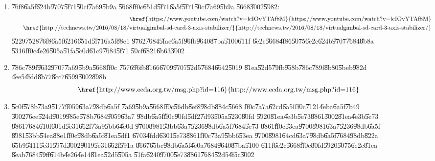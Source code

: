 \documentclass[12pt,a4paper]{article}
\begin{document}
\begin{enumerate}
\item \U{76f8}\U{6a5f}\U{624b}\U{9707}\U{5f71}\U{50cf}\U{7a69}\U{5b9a}%
\U{5668}\U{ff0c}\U{651d}\U{5f71}\U{6a5f}\U{5f71}\U{50cf}\U{7a69}\U{5b9a}%
\U{5668}\U{3002}\U{5982}:%
\begin{eqnarray*}
&&\text{\href{https://www.youtube.com/watch?v=lcIOvYTAf8M}{%
https://www.youtube.com/watch?v=lcIOvYTAf8M}} \\
&&\text{\href{http://technews.tw/2016/08/18/virtualgimbal-sd-card-3-axis-stabilizer/%
}{http://technews.tw/2016/08/18/virtualgimbal-sd-card-3-axis-stabilizer/}}
\end{eqnarray*}%
\U{5229}\U{7528}\U{76f8}\U{6a5f}\U{6216}\U{651d}\U{5f71}\U{6a5f}\U{88e1}%
\U{9762}\U{7684}\U{5fae}\U{6a5f}\U{96fb}\U{9640}\U{87ba}\U{5100}\U{611f}%
\U{6e2c}\U{5668}\U{4f86}\U{5075}\U{6e2c}\U{624b}\U{9707}\U{7684}\U{8b8a}%
\U{5316}\U{ff0c}\U{4e26}\U{505a}\U{51fa}\U{5c0d}\U{61c9}\U{7684}\U{5f71}%
\U{50cf}\U{6821}\U{6b63}\U{3002}

\item \U{786c}\U{789f}\U{9632}\U{9707}\U{7a69}\U{5b9a}\U{5668}\U{ff0c}%
\U{7576}\U{96fb}\U{8166}\U{6709}\U{9707}\U{52d5}\U{7684}\U{6642}\U{5019}%
\U{81ea}\U{52d5}\U{79fb}\U{958b}\U{786c}\U{789f}\U{8b80}\U{5beb}\U{982d}%
\U{4ee5}\U{4fdd}\U{8b77}\U{8cc7}\U{6599}\U{3002}\U{898b}%
\begin{equation*}
\text{\href{http://www.ecda.org.tw/msg.php?id=116}{%
http://www.ecda.org.tw/msg.php?id=116}}
\end{equation*}

\item \U{5c0f}\U{578b}\U{73a9}\U{5177}\U{9059}\U{63a7}\U{98db}\U{6a5f}%
\U{7a69}\U{5b9a}\U{5668}\U{ff0c}\U{56db}\U{8ef8}\U{98db}\U{884c}\U{5668}%
\U{ff0c}\U{7a7a}\U{62cd}\U{6a5f}\U{ff0c}\U{7121}\U{4eba}\U{6a5f}\U{7b49}%
\U{3002}\U{76ee}\U{524d}\U{9019}\U{985e}\U{578b}\U{7684}\U{9059}\U{63a7}%
\U{98db}\U{6a5f}\U{ff0c}\U{90fd}\U{5df2}\U{7d93}\U{505a}\U{5230}\U{80fd}%
\U{5920}\U{81ea}\U{4e3b}\U{5e73}\U{8861}\U{3002}\U{81ea}\U{4e3b}\U{5e73}%
\U{8861}\U{7684}\U{610f}\U{601d}\U{5c31}\U{662f}\U{73a9}\U{5bb6}\U{4e0d}%
\U{9700}\U{8981}\U{53bb}\U{63a7}\U{5236}\U{98db}\U{6a5f}\U{7684}\U{5e73}%
\U{8861}\U{ff0c}\U{53ea}\U{9700}\U{8981}\U{63a7}\U{5236}\U{98db}\U{6a5f}%
\U{8981}\U{53bb}\U{54ea}\U{88e1}\U{ff0c}\U{98db}\U{6a5f}\U{81ea}\U{5df1}%
\U{6703}\U{4fdd}\U{6301}\U{5e73}\U{8861}\U{ff0c}\U{73a9}\U{5bb6}\U{53ea}%
\U{9700}\U{8981}\U{64cd}\U{63a7}\U{98db}\U{6a5f}\U{7684}\U{98db}\U{822a}%
\U{65b9}\U{5411}\U{5c31}\U{597d}\U{3002}\U{9019}\U{5c31}\U{662f}\U{591a}%
\U{8667}\U{65bc}\U{98db}\U{6a5f}\U{4e0a}\U{7684}\U{9640}\U{87ba}\U{5100}%
\U{611f}\U{6e2c}\U{5668}\U{ff0c}\U{80fd}\U{5920}\U{5075}\U{6e2c}\U{81ea}%
\U{8eab}\U{7684}\U{59ff}\U{614b}\U{4e26}\U{4e14}\U{81ea}\U{52d5}\U{505a}%
\U{51fa}\U{6240}\U{9700}\U{5e73}\U{8861}\U{7684}\U{52d5}\U{4f5c}\U{3002}


\end{enumerate}
\end{document}
